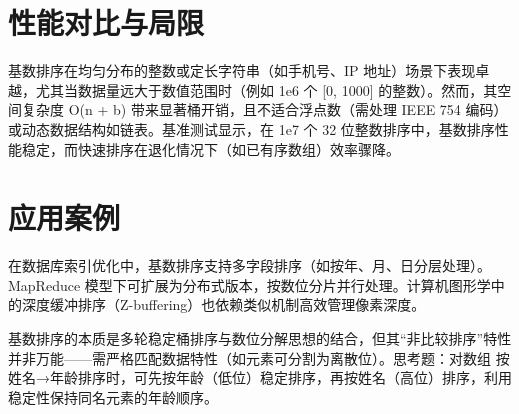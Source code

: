 \chapter{性能对比与局限}
基数排序在均匀分布的整数或定长字符串（如手机号、IP 地址）场景下表现卓越，尤其当数据量远大于数值范围时（例如 1e6 个 [0, 1000] 的整数）。然而，其空间复杂度 O(n + b) 带来显著桶开销，且不适合浮点数（需处理 IEEE 754 编码）或动态数据结构如链表。基准测试显示，在 1e7 个 32 位整数排序中，基数排序性能稳定，而快速排序在退化情况下（如已有序数组）效率骤降。\par
\chapter{应用案例}
在数据库索引优化中，基数排序支持多字段排序（如按年、月、日分层处理）。MapReduce 模型下可扩展为分布式版本，按数位分片并行处理。计算机图形学中的深度缓冲排序（Z-buffering）也依赖类似机制高效管理像素深度。\par
基数排序的本质是多轮稳定桶排序与数位分解思想的结合，但其“非比较排序”特性并非万能——需严格匹配数据特性（如元素可分割为离散位）。思考题：对数组  按姓名→年龄排序时，可先按年龄（低位）稳定排序，再按姓名（高位）排序，利用稳定性保持同名元素的年龄顺序。\par
